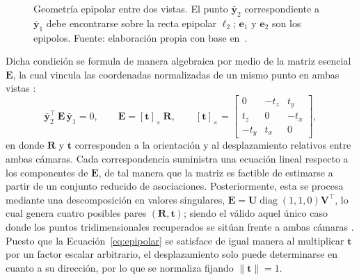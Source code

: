 \begin{figure}[H]
\centering
{}
\caption[Geometría epipolar entre dos vistas]{Geometría epipolar entre dos vistas. El punto $\bar{\mathbf{y}}_2$ correspondiente a $\bar{\mathbf{y}}_1$ debe encontrarse sobre la recta epipolar $\boldsymbol{\ell}_2$; $\mathbf{e}_1$ y $\mathbf{e}_2$ son los epipolos. Fuente: elaboración propia con base en~\cite{hartley2003mvg}.}
\label{fig:epipolar}
\end{figure}

Dicha condición se formula de manera algebraica por medio de la matriz esencial $\mathbf{E}$, la cual vincula las coordenadas normalizadas de un mismo punto en ambas vistas \cite{hartley2003mvg}:
\begin{equation}
\bar{\mathbf{y}}_2^{\top}\,\mathbf{E}\,\bar{\mathbf{y}}_1 = 0,
\qquad
\mathbf{E} = [\mathbf{t}]_{\times}\,\mathbf{R},
\qquad
[\mathbf{t}]_{\times} =
\begin{bmatrix}
0 & -t_z & t_y \\
t_z & 0 & -t_x \\
-t_y & t_x & 0
\end{bmatrix},
\label{eq:epipolar}
\end{equation}
en donde $\mathbf{R}$ y $\mathbf{t}$ corresponden a la orientación y al desplazamiento relativos entre ambas cámaras.
Cada correspondencia suministra una ecuación lineal respecto a los componentes de $\mathbf{E}$, de tal manera que la matriz es factible de estimarse a partir de un conjunto reducido de asociaciones.
Posteriormente, esta se procesa mediante una descomposición en valores singulares, $\mathbf{E} = \mathbf{U}\operatorname{diag}(1,1,0)\mathbf{V}^{\top}$, lo cual genera cuatro posibles pares $(\mathbf{R},\mathbf{t})$; siendo el válido aquel único caso donde los puntos tridimensionales recuperados se sitúan frente a ambas cámaras \cite{hartley2003mvg}.
Puesto que la Ecuación~\eqref{eq:epipolar} se satisface de igual manera al multiplicar $\mathbf{t}$ por un factor escalar arbitrario, el desplazamiento solo puede determinarse en cuanto a su dirección, por lo que se normaliza fijando $\|\mathbf{t}\|=1$.

